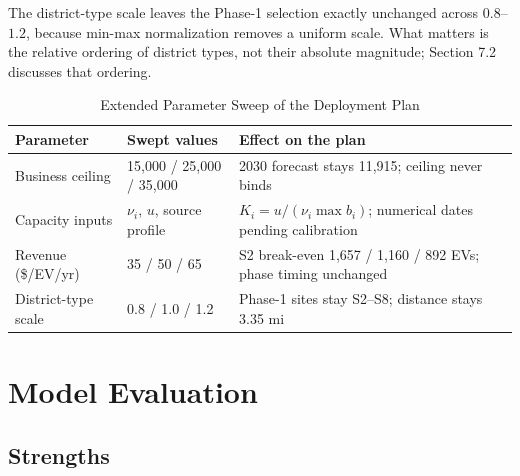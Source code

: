 \documentclass[12pt]{article}
\begin{document}
The district-type scale leaves the Phase-1 selection exactly unchanged across $0.8$--$1.2$,
because min-max normalization removes a uniform scale. What matters is the relative ordering
of district types, not their absolute magnitude; Section 7.2 discusses that ordering.

\begin{table}[H]
\centering
\caption{Extended Parameter Sweep of the Deployment Plan}
\label{tab:sweep}
\renewcommand{\arraystretch}{0.95}
\begin{tabular}{@{}p{}p{}p{}@{}}
\toprule
Parameter & Swept values & Effect on the plan \\
\midrule
Business ceiling & 15,000 / 25,000 / 35,000 & 2030 forecast stays 11,915; ceiling never binds \\
Capacity inputs & $\nu_i$, $u$, source profile & $K_i=u/(\nu_i\max b_i)$; numerical dates pending calibration \\
Revenue (\$/EV/yr) & 35 / 50 / 65 & S2 break-even 1,657 / 1,160 / 892 EVs; phase timing unchanged \\
District-type scale & 0.8 / 1.0 / 1.2 & Phase-1 sites stay S2--S8; distance stays 3.35 mi \\
\bottomrule
\end{tabular}
\end{table}



\section{Model Evaluation}

\subsection{Strengths}
\end{document}
